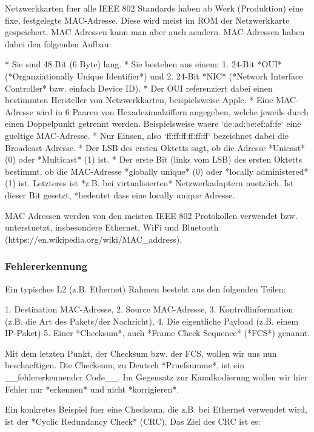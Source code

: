 Netzwerkkarten fuer alle IEEE 802 Standards haben ab Werk (Produktion) eine
fixe, festgelegte MAC-Adresse. Diese wird meist im ROM der Netzwerkkarte
gespeichert. MAC Adressen kann man aber auch aendern. MAC-Adressen haben dabei
den folgenden Aufbau:

* Sie sind 48 Bit (6 Byte) lang.
* Sie bestehen aus einem:
  1. 24-Bit *OUI* (*Organziationally Unique Identifier*) und
  2. 24-Bit *NIC* (*Network Interface Controller* bzw. einfach Device ID).
* Der OUI referenziert dabei einen bestimmten Hersteller von Netzwerkkarten,
  beispielsweise Apple.
* Eine MAC-Adresse wird in 6 Paaren von Hexadezimalziffern angegeben, welche
  jeweils durch einen Doppelpunkt getrennt werden. Beispielsweise waere
  `de:ad:be:ef:af:fe` eine gueltige MAC-Adresse.
* Nur Einsen, also `ff:ff:ff:ff:ff:ff` bezeichnet dabei die Broadcast-Adresse.
* Der LSB des ersten Oktetts sagt, ob die Adresse *Unicast* (0) oder *Multicast*
  (1) ist.
* Der erste Bit (links vom LSB) des ersten Oktetts bestimmt, ob die MAC-Adresse
  *globally unique* (0) oder *locally administered* (1) ist. Letzteres ist
  *z.B. bei virtualisierten* Netzwerkadaptern nuetzlich. Ist dieser Bit gesetzt,
  *bedeutet dass eine locally unique Adresse.

MAC Adressen werden von den meisten IEEE 802 Protokollen verwendet
bzw. unterstuetzt, insbesondere Ethernet, WiFi und Bluetooth
(https://en.wikipedia.org/wiki/MAC\_address).

\subsubsection{Fehlererkennung} 

Ein typisches L2 (z.B. Ethernet) Rahmen besteht aus den folgenden Teilen:

1. Destination MAC-Adresse,
2. Source MAC-Adresse,
3. Kontrollinformation (z.B. die Art des Pakets/der Nachricht),
4. Die eigentliche Payload (z.B. einem IP-Paket)
5. Einer *Checksum*, auch *Frame Check Sequence* (*FCS*) genannt.

Mit dem letzten Punkt, der Checksum bzw. der FCS, wollen wir uns nun
beschaeftigen. Die Checksum, zu Deutsch *Pruefsumme*, ist ein
\_\_fehlererkennender Code\_\_. Im Gegensatz zur Kanalkodierung wollen wir hier
Fehler nur *erkennen* und nicht *korrigieren*.

Ein konkretes Beispiel fuer eine Checksum, die z.B. bei Ethernet verwendet wird,
ist der *Cyclic Redundancy Check* (CRC). Das Ziel des CRC ist es:

